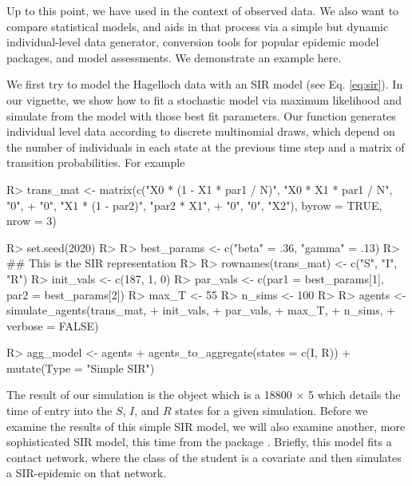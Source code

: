 \documentclass[
  shortnames]{jss}
\begin{document}
Up to this point, we have used  in the context of
observed data. We also want to compare statistical models, and
 aids in that process via a simple but dynamic
individual-level data generator, conversion tools for popular epidemic
model packages, and model assessments. We demonstrate an example here.

We first try to model the Hagelloch data with an SIR model (see Eq.
\ref{eq:sir}). In our vignette, we show how to fit a stochastic model
via maximum likelihood and simulate from the model with those best fit
parameters. Our function  generates individual
level data according to discrete multinomial draws, which depend on the
number of individuals in each state at the previous time step and a
matrix of transition probabilities. For example

\begin{CodeChunk}
\begin{CodeInput}
R> trans_mat <- matrix(c("X0 * (1 - X1 * par1 / N)", "X0 * X1  * par1 / N", "0",
+                   "0", "X1 * (1 - par2)", "par2 * X1",
+                   "0", "0", "X2"), byrow = TRUE, nrow = 3)
\end{CodeInput}
\end{CodeChunk}

\begin{CodeChunk}
\begin{CodeInput}
R> set.seed(2020)
R> 
R> best_params <- c("beta" = .36, "gamma" = .13)
R> ## This is the SIR representation
R> 
R> rownames(trans_mat) <- c("S", "I", "R")
R> init_vals <- c(187, 1, 0)
R> par_vals <- c(par1 = best_params[1], par2 = best_params[2])
R> max_T <- 55
R> n_sims <- 100
R> 
R> agents <- simulate_agents(trans_mat,
+                        init_vals,
+                        par_vals,
+                        max_T,
+                        n_sims,
+                        verbose = FALSE)
\end{CodeInput}
\end{CodeChunk}

\begin{CodeChunk}
\begin{CodeInput}
R> agg_model <- agents %
+   agents_to_aggregate(states = c(I, R)) %
+   mutate(Type = "Simple SIR")
\end{CodeInput}
\end{CodeChunk}

The result of our simulation is the object  which is a
18800 \(\times\) 5 which details the time of entry into the \(S\),
\(I\), and \(R\) states for a given simulation. Before we examine the
results of this simple SIR model, we will also examine another, more
sophisticated SIR model, this time from the package .
Briefly, this model fits a contact network, where the class of the
student is a covariate and then simulates a SIR-epidemic on that
network.
\end{document}
